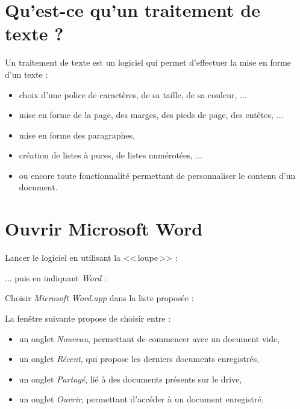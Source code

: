 \section{Qu'est-ce qu'un traitement de texte ?} 

Un traitement de texte est un logiciel qui permet d'effectuer la mise en forme d'un texte : 
\begin{itemize}
\item choix d'une police de caractères, de sa taille, de sa couleur, ...
\item mise en forme de la page, des marges, des pieds de page, des entêtes, ... 
\item mise en forme des paragraphes, 
\item création de listes à puces, de listes numérotées, ...
\item ou encore toute fonctionnalité permettant de personnaliser le contenu d'un document.
\end{itemize}




\section{Ouvrir Microsoft Word}

Lancer le logiciel en utilisant la <<\,loupe\,>> :


... puis en indiquant \emph{Word} :


Choisir \emph{Microsoft Word.app} dans la liste proposée :


La fenêtre suivante propose de choisir entre :
\begin{itemize}
\item un onglet \emph{Nouveau}, permettant de commencer avec un document vide,
\item un onglet \emph{Récent}, qui propose les derniers documents enregistrés,
\item un onglet \emph{Partagé}, lié à des documents présents sur le drive,
\item un onglet \emph{Ouvrir}, permettant d'accéder à un document enregistré.
\end{itemize}

